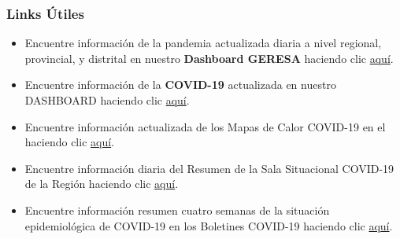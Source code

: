 \documentclass[xcolor=table]{beamer}
\begin{document}

\begin{frame}[label=links]
	\frametitle{Links Útiles}
	\vspace{-.5cm}
	\begin{itemize}
		\item Encuentre {\color{mycolor4} información de la pandemia actualizada diaria a nivel regional, provincial, y distrital} en nuestro {\color{mycolor4}\textbf{Dashboard GERESA}} haciendo clic \href{https://geresacusc.shinyapps.io/GERESA_dashboard/}{\color{mycolor2}aquí}.
		\item Encuentre {\color{mycolor4} información de la {\color{mycolor4}\textbf{COVID-19}} actualizada} en nuestro DASHBOARD haciendo clic \href{https://sites.google.com/view/geresacusco/inicio}{\color{mycolor2}aquí}.
		\item Encuentre información actualizada de los {\color{mycolor4}Mapas de Calor COVID-19} en el haciendo clic \href{http://www.diresacusco.gob.pe/diresa/}{\color{mycolor2}aquí}.
		\item Encuentre información diaria del {\color{mycolor4} Resumen de la Sala Situacional COVID-19} de la Región haciendo clic \href{https://app.powerbi.com/view?r=eyJrIjoiZDdiMzA4YWMtZTZmNC00ZWE2LWFmMmYtODkwZmM1ODhiYTljIiwidCI6IjM2NGE0NmEwLTk0YzctNGZkNi1iYTNjLTlmMmQzMjA5YzFlZiJ9}{\color{mycolor2}aquí}.
		\item Encuentre información resumen cuatro semanas de la situación epidemiológica de COVID-19 en los {\color{mycolor4}Boletines COVID-19} haciendo clic \href{https://sites.google.com/view/geresacusco/boletines-epidemiologicos-covid-19}{\color{mycolor2}aquí}. \hyperlink{indice}{}
	\end{itemize}
\end{frame}


\end{document}
